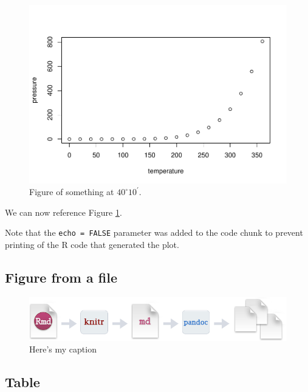 \documentclass[]{article}
\begin{document}
\begin{figure}[htbp]
\centering
\includegraphics{Workshop_examples_files/figure-latex/pressure-1.pdf}
\caption{Figure of something at \(40^\circ 10^\prime\).
\label{fig:pressure}}
\end{figure}

\FloatBarrier

We can now reference Figure \ref{fig:pressure}.

Note that the \texttt{echo\ =\ FALSE} parameter was added to the code
chunk to prevent printing of the R code that generated the plot.

\subsection{Figure from a file}\label{figure-from-a-file}

\begin{figure}[htbp]
\centering
\includegraphics{RMarkdownFLow.png}
\caption{Here's my caption \label{fig:fig_example}}
\end{figure}

\subsection{Table}\label{table}
\end{document}
